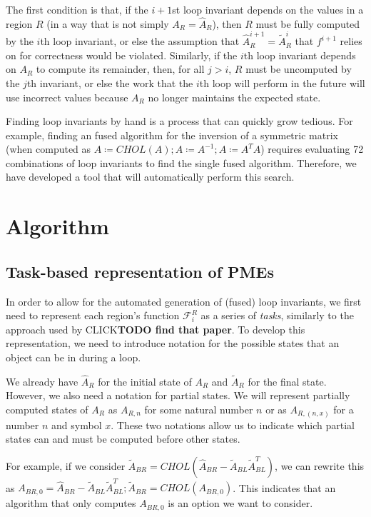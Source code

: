\documentclass[12pt,letterpaper]{article}
\newcommand*{\opF}{\mathcal{F}}
\newcommand*{\opf}{f}
\begin{document}
The first condition is that, if the $i + 1$st loop invariant depends on the values in a region $R$ (in a way that is not simply $A_R = \hat{A}_R$), then $R$ must be fully computed by the $i$th loop invariant, or else the assumption that $\hat{A}^{i + 1}_R = \widetilde{A}^i_R$ that $\opf^{i + 1}$ relies on for correctness would be violated.
Similarly, if the $i$th loop invariant depends on $A_R$ to compute its remainder, then, for all $j > i$, $R$ must be uncomputed by the $j$th invariant, or else the work that the $i$th loop will perform in the future will use incorrect values because $A_R$ no longer maintains the expected state.

Finding loop invariants by hand is a process that can quickly grow tedious.
For example, finding an fused algorithm for the inversion of a symmetric matrix (when computed as $A \coloneqq CHOL(A); A \coloneqq A^{-1}; A \coloneqq A^TA$) requires evaluating 72 combinations of loop invariants to find the single fused algorithm.
Therefore, we have developed a tool that will automatically perform this search.

\section{Algorithm}

\subsection{Task-based representation of PMEs}
In order to allow for the automated generation of (fused) loop invariants, we first need to represent each region's function $\opF_i^R$ as a series of \emph{tasks}, similarly to the approach used by CLICK\textbf{TODO find that paper}.
To develop this representation, we need to introduce notation for the possible states that an object can be in during a loop.

We already have $\hat{A}_R$ for the initial state of $A_R$ and $\widetilde{A}_R$ for the final state.
However, we also need a notation for partial states.
We will represent partially computed states of $A_R$ as $A_{R, n}$ for some natural number $n$ or as $A_{R, (n, x)}$ for a number $n$ and symbol $x$.
These two notations allow us to indicate which partial states can and must be computed before other states.

For example, if we consider $\widetilde{A}_{BR} = CHOL(\hat{A}_{BR} - \widetilde{A}_{BL}\widetilde{A}_{BL}^T)$, we can rewrite this as $A_{BR, 0} = \hat{A}_{BR} - \widetilde{A}_{BL}\widetilde{A}_{BL}^T; \widetilde{A}_{BR} = CHOL(A_{BR, 0})$.
This indicates that an algorithm that only computes $A_{BR, 0}$ is an option we want to consider.
\end{document}
